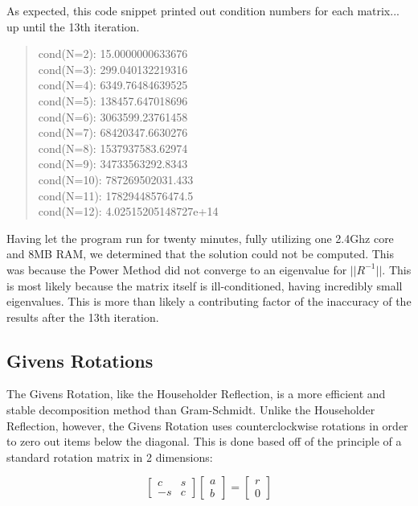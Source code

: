 \documentclass[letterpaper,12pt]{article}
\begin{document}
As expected, this code snippet printed out condition numbers for each matrix...
up until the 13th iteration.

\begin{quote}
cond(N=2):  15.0000000633676\\
cond(N=3):  299.040132219316\\
cond(N=4):  6349.76484639525\\
cond(N=5):  138457.647018696\\
cond(N=6):  3063599.23761458\\
cond(N=7):  68420347.6630276\\
cond(N=8):  1537937583.62974\\
cond(N=9):  34733563292.8343\\
cond(N=10): 787269502031.433\\
cond(N=11): 17829448576474.5\\
cond(N=12): 4.02515205148727e+14
\end{quote}

Having let the program run for twenty minutes, fully utilizing one 2.4Ghz core
and 8MB RAM, we determined that the solution could not be computed.
This was because the Power Method did not converge to an eigenvalue for
$||R^{-1}||$.
This is most likely because the matrix itself is ill-conditioned, having incredibly
small eigenvalues.
This is more than likely a contributing factor of the inaccuracy of the results
after the 13th iteration.

\subsection{Givens Rotations}

The Givens Rotation, like the Householder Reflection, is a more efficient and
stable decomposition method than Gram-Schmidt.
Unlike the Householder Reflection, however, the Givens Rotation uses counterclockwise
rotations in order to zero out items below the diagonal.
This is done based off of the principle of a standard rotation matrix in 2 dimensions:

\[\left[ \begin{array}{cc} c & s \\ -s & c \end{array} \right]
\left[ \begin{array}{c} a \\ b \end{array} \right] =
\left[ \begin{array}{c} r \\ 0 \end{array} \right] \]
\end{document}
